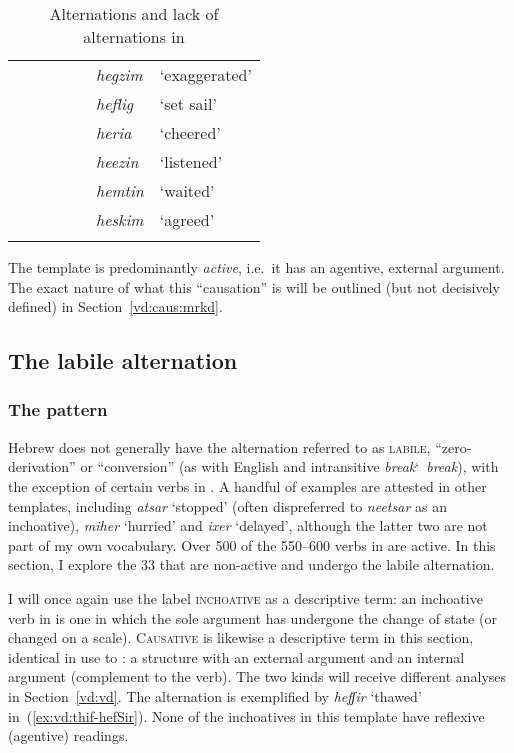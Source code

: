 \begin{exe}
\begin{xlist}
\begin{xlist}
\begin{exe}
\begin{table}
{\begin{tabular}{lllllll}
		& &&&&  \emph{hegzim} & `exaggerated' \\
		& &&&&  \emph{heflig} & `set sail' \\
		& &&&&  \emph{heria} & `cheered' \\
		& &&&& \emph{heezin} & `listened'\\
		& &&&& \emph{hemtin} & `waited'\\
		& &&&& \emph{heskim} & `agreed'\\
\lspbottomrule
 	\end{tabular}}
	\caption{Alternations and lack of alternations in {\thif}\label{table:vd:alternations-heb-long}}
\end{table}

The template is predominantly \emph{active}, i.e.~it has an agentive, external argument. The exact nature of what this ``causation'' is will be outlined (but not decisively defined) in Section~\ref{vd:caus:mrkd}.


	\subsection{The labile alternation} \label{vd:thif:inch}
		\subsubsection{The pattern}
Hebrew does not generally have the alternation referred to as \textsc{labile}, ``zero-derivation'' or ``conversion'' (as with English  and intransitive \emph{break}\char`~\linebreak\emph{break}), with the exception of certain verbs in {\thif}. A handful of examples are attested in other templates, including \emph{a{ts}ar} `stopped' (often dispreferred to \emph{nee{ts}ar} as an inchoative), \emph{miher} `hurried' and \emph{ixer} `delayed', although the latter two are not part of my own  vocabulary. Over 500 of the 550--600 verbs in {\thif} are active. In this section, I explore the 33 that are non-active and undergo the labile alternation.

I will once again use the label \textsc{inchoative} as a descriptive term: an inchoative verb in {\thif} is one in which the sole argument has undergone the change of state (or changed on a scale). \textsc{Causative} is likewise a descriptive term in this section, identical in use to \textsc{}: a structure with an external argument and an internal argument (complement to the verb). The two kinds will receive different analyses in Section~\ref{vd:vd}. The alternation is exemplified by \emph{hefʃir} `thawed' in~(\ref{ex:vd:thif-hefSir}). None of the inchoatives in this template have reflexive (agentive) readings.


\end{exe}
\end{xlist}
\end{xlist}
\end{exe}
